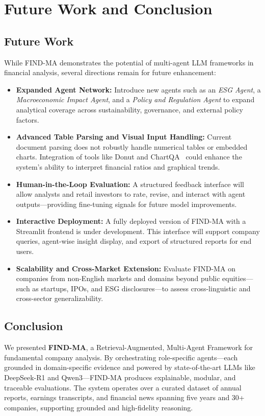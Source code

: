 \documentclass[11pt]{article}
\newcommand{\findma}{\textsc{FIND-MA}}
\begin{document}
\section{Future Work and Conclusion}
\label{sec:conclusion}
\subsection*{Future Work}
While \findma{} demonstrates the potential of multi-agent LLM frameworks in financial analysis, several directions remain for future enhancement:
\begin{itemize}
    \item \textbf{Expanded Agent Network:} Introduce new agents such as an \textit{ESG Agent}, a \textit{Macroeconomic Impact Agent}, and a \textit{Policy and Regulation Agent} to expand analytical coverage across sustainability, governance, and external policy factors.
    \item \textbf{Advanced Table Parsing and Visual Input Handling:} Current document parsing does not robustly handle numerical tables or embedded charts. Integration of tools like Donut and ChartQA~\citep{kim2022donut,liu2022chartqa} could enhance the system’s ability to interpret financial ratios and graphical trends.
    \item \textbf{Human-in-the-Loop Evaluation:} A structured feedback interface will allow analysts and retail investors to rate, revise, and interact with agent outputs—providing fine-tuning signals for future model improvements.
    \item \textbf{Interactive Deployment:} A fully deployed version of \findma{} with a Streamlit frontend is under development. This interface will support company queries, agent-wise insight display, and export of structured reports for end users.
    \item \textbf{Scalability and Cross-Market Extension:} Evaluate \findma{} on companies from non-English markets and domains beyond public equities—such as startups, IPOs, and ESG disclosures—to assess cross-linguistic and cross-sector generalizability.
\end{itemize}

\subsection*{Conclusion}
We presented \textbf{\findma{}}, a Retrieval-Augmented, Multi-Agent Framework for fundamental company analysis. By orchestrating role-specific agents—each grounded in domain-specific evidence and powered by state-of-the-art LLMs like DeepSeek-R1 and Qwen3—\findma{} produces explainable, modular, and traceable evaluations. The system operates over a curated dataset of annual reports, earnings transcripts, and financial news spanning five years and 30+ companies, supporting grounded and high-fidelity reasoning.
\end{document}
